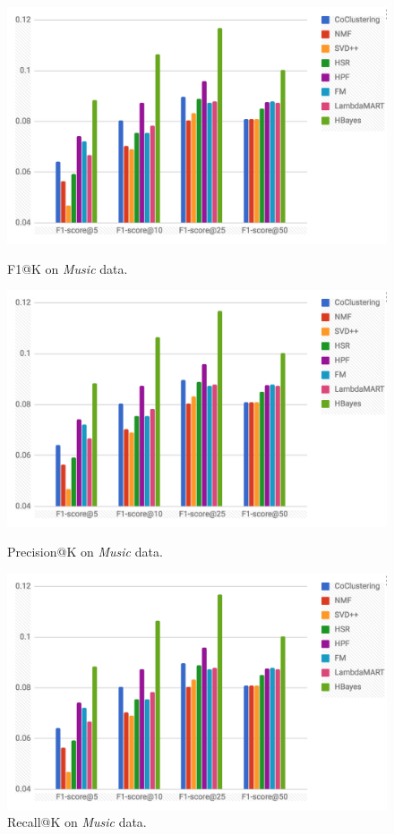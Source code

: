 \begin{figure}[!htb]
  \includegraphics[width=\linewidth]{fig/test}
  \caption{F1@K on \emph{Music} data.}\label{fig:awesome_image1}
\endminipage\hfill
{}
  \includegraphics[width=\linewidth]{fig/test}
  \caption{Precision@K on \emph{Music} data.}\label{fig:awesome_image2}
\endminipage\hfill
{}%
  \includegraphics[width=\linewidth]{fig/test}
  \caption{Recall@K on \emph{Music} data.}\label{fig:awesome_image3}
\endminipage
\end{figure}


